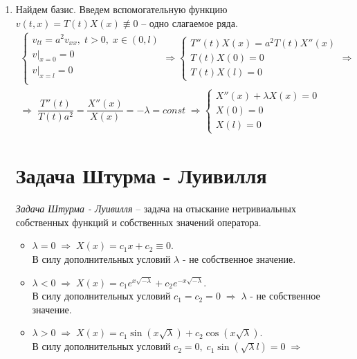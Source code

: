 \begin{enumerate}
	\item 
		Найдем базис. Введем вспомогательную функцию $ v(t, x) = T(t)X(x) \not\equiv 0 $ -- одно слагаемое ряда.
		$$\begin{gathered}
			\begin{cases}
				v_{tt} = a^2v_{xx}, \; t > 0, \; x \in (0, l) \\
				v|_{x = 0} = 0 \\
				v|_{x = l} = 0 \\
			\end{cases} \Rightarrow \begin{cases}
				T''(t)X(x) = a^2T(t)X''(x) \\
				T(t)X(0) = 0\\
				T(t)X(l) = 0
			\end{cases} \Rightarrow \\
			\Rightarrow \; \dfrac{T''(t)}{T(t)a^2} = \dfrac{X''(x)}{X(x)} = -\lambda = const \; \Rightarrow \begin{cases}
				X''(x) + \lambda X(x) = 0 \\
				X(0) = 0\\
				X(l) = 0
			\end{cases}
		\end{gathered}$$

		\section*{Задача Штурма - Луивилля}

		\textit{Задача Штурма - Луивилля} -- задача на отыскание нетривиальных собственных функций и собственных значений оператора.

		\begin{itemize}
			\item 
				$ \lambda = 0 \; \Rightarrow \;  X(x) = c_1x + c_2 \equiv 0$.\\
				В силу дополнительных условий $\lambda $ - не собственное значение.
				\hfill \break
			\item  
				$ \lambda < 0 \; \Rightarrow \;  X(x) = c_1e^{x\sqrt{-\lambda}} + c_2e^{-x\sqrt{-\lambda}}$.\\
				В силу дополнительных условий $ c_1 = c_2 = 0 \; \Rightarrow \;  \lambda $ - не собственное значение.
				\hfill \break
			\item 
				$ \lambda > 0 \; \Rightarrow \;  X(x) = c_1\sin(x\sqrt{\lambda}) + c_2\cos(x\sqrt{\lambda})$.\\ 
				В силу дополнительных условий $ c_2 = 0, \; c_1\sin(\sqrt{\lambda}l) = 0 \; \Rightarrow$


\end{itemize}
\end{enumerate}
